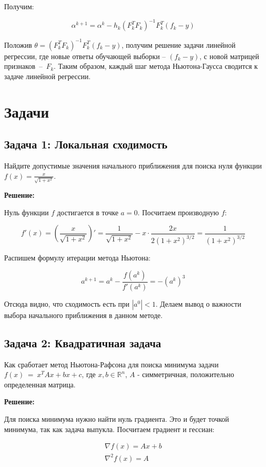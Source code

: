 {Получим:

\[
\alpha^{k + 1} = \alpha^{k} - h_{k}(F_{k}^{T}F_{k})^{-1}F_{k}^{T}(f_{k} - y)
\]

Положив \( \theta = (F_{k}^{T}F_{k})^{-1}F_{k}^{T}(f_{k} - y) \), получим решение задачи линейной регрессии, где новые ответы обучающей выборки -- \( \left(f_{k} - y \right) \), с новой матрицей признаков~--~\( F_{k} \). Таким образом, каждый шаг метода Ньютона-Гаусса сводится к задаче линейной регрессии. 

\section*{Задачи}

\subsection*{Задача 1: Локальная сходимость}

Найдите допустимые значения начального приближения для поиска нуля функции \( f(x) = \frac{x}{\sqrt{1 + x^{2}}} \).

\textbf{Решение:}

Нуль функции \( f \) достигается в точке \( a = 0\). Посчитаем производную \( f \):

\[
f'(x) = \left(\frac{x}{\sqrt{1 + x^{2}}}\right)' = \frac{1}{\sqrt{1 + x^{2}}} - x\cdot\frac{2x}{2(1 + x^{2})^{3/2}} = \frac{1}{(1 + x^{2})^{3/2}}
\]

Распишем формулу итерации метода Ньютона:

\[
a^{k + 1} = a^{k} - \frac{f(a^{k})}{f'(a^{k})} = -(a^{k})^3
\]

Отсюда видно, что сходимость есть при \( |a^{0}| < 1 \). Делаем вывод о важности выбора начального приближения в данном методе.

\subsection*{Задача 2: Квадратичная задача}

Как сработает метод Ньютона-Рафсона для поиска минимума задачи \( f(x)~=~x^{T}Ax + bx + c\),  где $x, b \in \mathbb{R}^{n}$, $A$ - симметричная, положительно определенная матрица.

\textbf{Решение:}

Для поиска минимума нужно найти нуль градиента. Это и будет точкой минимума, так как задача выпукла.
Посчитаем градиент и гессиан:

\begin{gather*}
    \nabla f(x) = Ax + b\\[1em]
    \nabla^{2} f(x) = A
\end{gather*}

}
